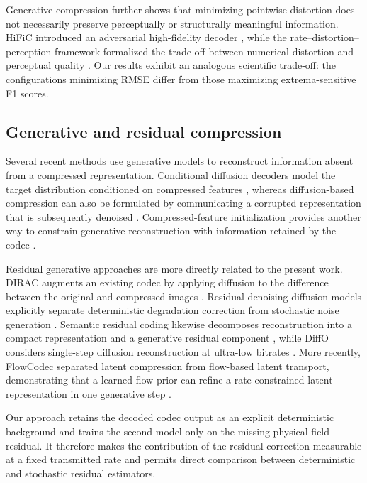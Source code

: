 \documentclass[11pt]{article}
\begin{document}
Generative compression further shows that minimizing pointwise distortion does not necessarily preserve perceptually or structurally meaningful information. HiFiC introduced an adversarial high-fidelity decoder \cite{mentzer2020high}, while the rate--distortion--perception framework formalized the trade-off between numerical distortion and perceptual quality \cite{blau2019rethinking}. Our results exhibit an analogous scientific trade-off: the configurations minimizing RMSE differ from those maximizing extrema-sensitive F1 scores.

\subsection{Generative and residual compression}

Several recent methods use generative models to reconstruct information absent from a compressed representation. Conditional diffusion decoders model the target distribution conditioned on compressed features \cite{yang2023lossy}, whereas diffusion-based compression can also be formulated by communicating a corrupted representation that is subsequently denoised \cite{theis2022lossy}. Compressed-feature initialization provides another way to constrain generative reconstruction with information retained by the codec \cite{li2024diffusion}.

Residual generative approaches are more directly related to the present work. DIRAC augments an existing codec by applying diffusion to the difference between the original and compressed images \cite{ghouse2023residual}. Residual denoising diffusion models explicitly separate deterministic degradation correction from stochastic noise generation \cite{liu2024residual}. Semantic residual coding likewise decomposes reconstruction into a compact representation and a generative residual component \cite{ke2025ultra}, while DiffO considers single-step diffusion reconstruction at ultra-low bitrates \cite{park2025diffo}. More recently, FlowCodec separated latent compression from flow-based latent transport, demonstrating that a learned flow prior can refine a rate-constrained latent representation in one generative step \cite{huang2026flowcodec}.

Our approach retains the decoded codec output as an explicit deterministic background and trains the second model only on the missing physical-field residual. It therefore makes the contribution of the residual correction measurable at a fixed transmitted rate and permits direct comparison between deterministic and stochastic residual estimators.
\end{document}
